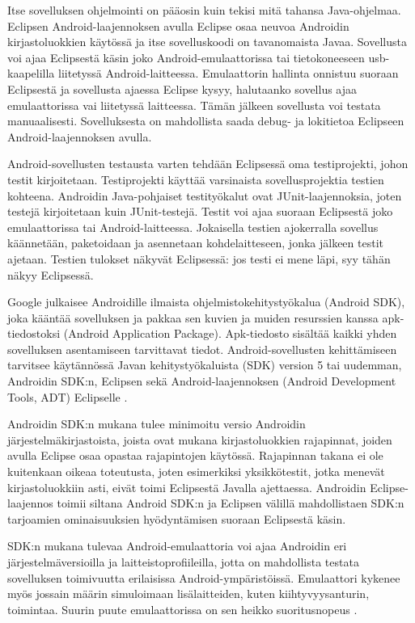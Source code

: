 Itse sovelluksen ohjelmointi on pääosin kuin tekisi mitä tahansa Java-ohjelmaa. Eclipsen Android-laajennoksen avulla Eclipse osaa neuvoa Androidin kirjastoluokkien käytössä ja itse sovelluskoodi on tavanomaista Javaa. Sovellusta voi ajaa Eclipsestä käsin joko Android-emulaattorissa tai tietokoneeseen usb-kaapelilla liitetyssä Android-laitteessa. Emulaattorin hallinta onnistuu suoraan Eclipsestä ja sovellusta ajaessa Eclipse kysyy, halutaanko sovellus ajaa emulaattorissa vai liitetyssä laitteessa. Tämän jälkeen sovellusta voi testata manuaalisesti. Sovelluksesta on mahdollista saada debug- ja lokitietoa Eclipseen Android-laajennoksen avulla.

Android-sovellusten testausta varten tehdään Eclipsessä oma testiprojekti, johon testit kirjoitetaan. Testiprojekti käyttää varsinaista sovellusprojektia testien kohteena. Androidin Java-pohjaiset testityökalut ovat JUnit-laajennoksia, joten testejä kirjoitetaan kuin JUnit-testejä. Testit voi ajaa suoraan Eclipsestä joko emulaattorissa tai Android-laitteessa. Jokaisella testien ajokerralla sovellus käännetään, paketoidaan ja asennetaan kohdelaitteseen, jonka jälkeen testit ajetaan. Testien tulokset näkyvät Eclipsessä: jos testi ei mene läpi, syy tähän näkyy Eclipsessä.

Google julkaisee Androidille ilmaista ohjelmistokehitystyökalua (Android SDK), joka kääntää sovelluksen ja pakkaa sen kuvien ja muiden resurssien kanssa apk-tiedostoksi (Android Application Package). Apk-tiedosto sisältää kaikki yhden sovelluksen asentamiseen tarvittavat tiedot. Android-sovellusten kehittämiseen tarvitsee käytännössä Javan kehitystyökaluista (SDK) version 5 tai uudemman, Androidin SDK:n, Eclipsen sekä Android-laajennoksen (Android Development Tools, ADT) Eclipselle \cite[25]{androidgamedev}.

Androidin SDK:n mukana tulee minimoitu versio Androidin järjestelmäkirjastoista, joista ovat mukana kirjastoluokkien rajapinnat, joiden avulla Eclipse osaa opastaa rajapintojen käytössä. Rajapinnan takana ei ole kuitenkaan oikeaa toteutusta, joten esimerkiksi yksikkötestit, jotka menevät kirjastoluokkiin asti, eivät toimi Eclipsestä Javalla ajettaessa. Androidin Eclipse-laajennos toimii siltana Android SDK:n ja Eclipsen välillä mahdollistaen SDK:n tarjoamien ominaisuuksien hyödyntämisen suoraan Eclipsestä käsin.

SDK:n mukana tulevaa Android-emulaattoria voi ajaa Androidin eri järjestelmäversioilla ja laitteistoprofiileilla, jotta on mahdollista testata sovelluksen toimivuutta erilaisissa Android-ympäristöissä. Emulaattori kykenee myös jossain määrin simuloimaan lisälaitteiden, kuten kiihtyvyysanturin, toimintaa. Suurin puute emulaattorissa on sen heikko suoritusnopeus \cite[25-50]{androidgamedev}.

